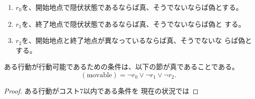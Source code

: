 \begin{nota} \label{nota:r_s}
 \begin{enumerate}
  \item $r_0$を、開始地点で隠伏状態であるならば真、そうでないならば偽とする。
  \item $r_1$を、終了地点で隠伏状態であるならば真、そうでないならば偽と
        する。
  \item $r_2$を、開始地点と終了地点が異なっているならば真、そうでないな
        らば偽とする。
 \end{enumerate}
\end{nota}

\begin{prop} \label{prop:kengen_inpuku}
 ある行動が行動可能であるための条件は、以下の節が真であることである。
 \begin{equation}
  (\text{movable}) = \lnot r_0 \lor \lnot r_1 \lor \lnot r_2.
 \end{equation}
\end{prop}

\begin{proof}
 ある行動がコスト$7$以内である条件を
 現在の状況では
\end{proof}


